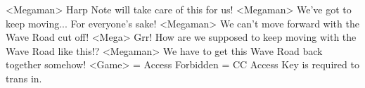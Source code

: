 <Megaman> Harp Note will take care of this for us! 
<Megaman> We've got to keep moving... For everyone's sake! 
<Megaman> We can't move forward with the Wave Road cut off! 
<Mega> Grr! How are we supposed to keep moving with the Wave Road like this!? 
<Megaman> We have to get this Wave Road back together somehow! 
<Game> = Access Forbidden = CC Access Key is required to trans in. 
